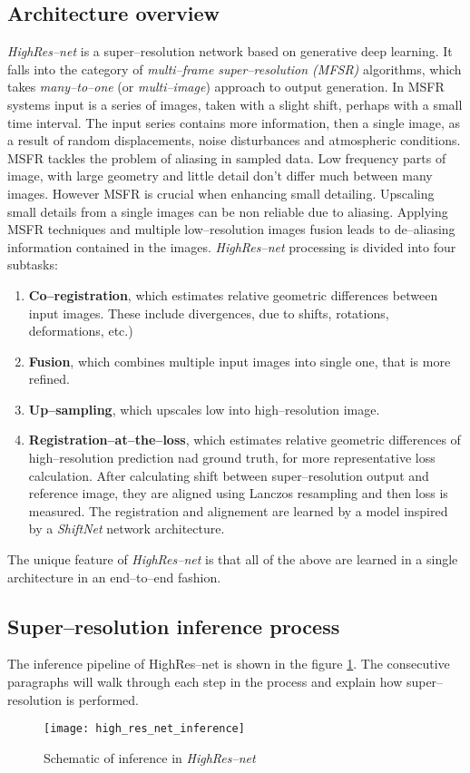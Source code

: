 \subsection{Architecture overview}
\textit{HighRes--net} \cite{deudon-2020-highresnet} is a super--resolution network based on generative deep learning.
It falls into the category of \textit{multi--frame super--resolution (MFSR)} algorithms, which takes \textit{many--to--one} (or \textit{multi--image}) approach to output generation.
In MSFR systems input is a series of images, taken with a slight shift, perhaps with a small time interval.
The input series contains more information, then a single image, as a result of random displacements, noise disturbances and atmospheric conditions.
MSFR tackles the problem of aliasing in sampled data.
Low frequency parts of image, with large geometry and little detail don't differ much between many images.
However MSFR is crucial when enhancing small detailing.
Upscaling small details from a single images can be non reliable due to aliasing.
Applying MSFR techniques and multiple low--resolution images fusion leads to de--aliasing information contained in the images.
\textit{HighRes--net} processing is divided into four subtasks:
\begin{enumerate}
	\item \textbf{Co--registration}, which estimates relative geometric differences between input images. These include divergences, due to shifts, rotations, deformations, etc.)
	\item \textbf{Fusion}, which combines multiple input images into single one, that is more refined.
	\item \textbf{Up--sampling}, which upscales low into high--resolution image.
	\item \textbf{Registration--at--the--loss}, which estimates relative geometric differences of high--resolution prediction nad ground truth, for more representative loss calculation. After calculating shift between super--resolution output and reference image, they are aligned using Lanczos resampling and then loss is measured.
	    The registration and alignement are learned by a model inspired by a \textit{ShiftNet} network architecture.
\end{enumerate}
The unique feature of \textit{HighRes--net} is that all of the above are learned in a single architecture in an end--to--end fashion.

\subsection{Super--resolution inference process}
The inference pipeline of HighRes--net is shown in the figure \ref{fig:highresnet-inference}.
The consecutive paragraphs will walk through each step in the process and explain how super--resolution is performed.
\begin{figure}
    \centering
    \texttt{[image: high\_res\_net\_inference]}
    \caption{Schematic of inference in \textit{HighRes--net}}
    \label{fig:highresnet-inference}
\end{figure}

